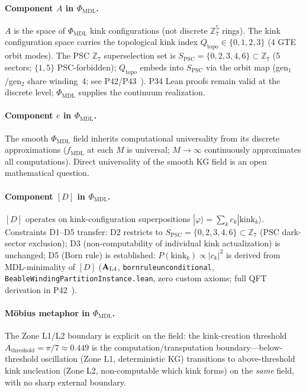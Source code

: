 \documentclass[12pt,letterpaper]{article}
\newcommand{\fmdl}{f_{\mathrm{MDL}}}
\newcommand{\Zseven}{\mathbb{Z}_7}
\newcommand{\Dclass}{[D]}
\newcommand{\catAL}{\ensuremath{\textbf{A}_{\rm L4}}}
\newcommand{\lean}[1]{%
  \penalty-100
  \begingroup\def\_{\textunderscore\allowbreak}\texttt{#1}\endgroup}
\begin{document}
\paragraph{Component $A$ in $\Phi_{\mathrm{MDL}}$.}
$A$ is the space of $\Phi_{\mathrm{MDL}}$ kink configurations (not discrete
$\Zseven^5$ rings).
The kink configuration space carries the topological kink index
$Q_{\mathrm{topo}} \in \{0,1,2,3\}$ (4 GTE orbit modes).
The PSC $\mathbb{Z}_7$ superselection set is
$S_{\mathrm{PSC}} = \{0,2,3,4,6\} \subset \mathbb{Z}_7$
(5 sectors; $\{1,5\}$ PSC-forbidden); $Q_{\mathrm{topo}}$ embeds
into $S_{\mathrm{PSC}}$ via the orbit map (gen$_1$/gen$_2$ share
winding~4; see P42/P43~\cite{SpivackPhiMDLField,SpivackCompleteness}).
P34 Lean proofs remain valid at the discrete level; $\Phi_{\mathrm{MDL}}$ supplies
the continuum realization.

\paragraph{Component $e$ in $\Phi_{\mathrm{MDL}}$.}
The smooth $\Phi_{\mathrm{MDL}}$ field inherits computational universality from
its discrete approximations ($\fmdl$ at each $M$ is universal; $M \to \infty$
continuously approximates all computations).
Direct universality of the smooth KG field is an open mathematical question.

\paragraph{Component $\Dclass$ in $\Phi_{\mathrm{MDL}}$.}
$\Dclass$ operates on kink-configuration superpositions
$|\varphi\rangle = \sum_k c_k|\mathrm{kink}_k\rangle$.
Constraints D1--D5 transfer: D2 restricts to $S_{\mathrm{PSC}} = \{0,2,3,4,6\} \subset \mathbb{Z}_7$
(PSC dark-sector exclusion); D3 (non-computability of individual kink actualization)
is unchanged; D5 (Born rule) is established: $P(\mathrm{kink}_k) \propto |c_k|^2$ is derived from MDL-minimality of $\Dclass$ ($\catAL$, \lean{born\_rule\_unconditional}, \lean{BeableWindingPartitionInstance.lean}, zero custom axioms; full QFT derivation in P42~\cite{SpivackPhiMDLField}).

\paragraph{M\"{o}bius metaphor in $\Phi_{\mathrm{MDL}}$.}
The Zone L1/L2 boundary is explicit on the field: the kink-creation threshold
$A_{\mathrm{threshold}} = \pi/7 \approx 0.449$ is the
computation/transputation boundary---below-threshold oscillation (Zone L1,
deterministic KG) transitions to above-threshold kink nucleation (Zone L2,
non-computable which kink forms) on the \emph{same} field, with no sharp external
boundary.
\end{document}
